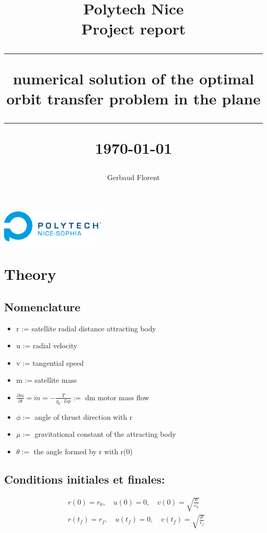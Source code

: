 \documentclass{article}
\title{\textbf{\Huge Polytech Nice}\\[1cm]
	\textbf{\LARGE Project report}\\[2cm]
	\hrule height 1pt
	\vspace{0.5cm}
	\textbf{\Large numerical solution of the optimal orbit transfer problem in the 
		plane}\\[0.5cm]
	\hrule height 1pt
	\vspace{3cm}
	\small{\today}}
\author{
	\begin{tabular}{c}
		Gerbaud Florent \\
	\end{tabular}
}
\date{}
\begin{document}
	\maketitle
	\vspace{3cm}
	\begin{center}
		\includegraphics[width=5cm]{Polytech.png}
	\end{center}
	\newpage %
	\renewcommand{\contentsname}{
		\hfill
		\begin{tikzpicture}
			\node[draw, fill=white, inner sep=20pt,line width=1.5pt] {\fontsize{30}{36}\selectfont\bfseries Table des matières};
		\end{tikzpicture}
		\hfill
	}
	\tableofcontents
	\listofalgorithms
	\listoffigures
	\newpage
	
	\section{Theory}
	
	\subsection{Nomenclature}
		\begin{itemize}
			\item r := satellite radial distance attracting body
			\item u := radial velocity
			\item v := tangential speed
			\item m := satellite mass
			\item $\frac{\partial m}{\partial t} = \dot{m} = -\frac{T}{g_0 \cdot Isp} := $  dm motor mass flow
			\item $\phi := $ angle of thrust direction with r
			\item $\mu := $  gravitational constant of the attracting body
			\item $\theta := $ the angle formed by r with r(0)
		\end{itemize}
		
		\subsection{Conditions initiales et finales:}
		\[ \boxed{\begin{aligned}
				& r(0)=r_0, \quad u(0)=0, \quad v(0)=\sqrt{\frac{\mu}{r_0}} \\
				& r\left(t_f\right)=r_f, \quad u\left(t_f\right)=0, \quad v\left(t_f\right)=\sqrt{\frac{\mu}{r_f}}
		\end{aligned}} \]
	 
\end{document}
